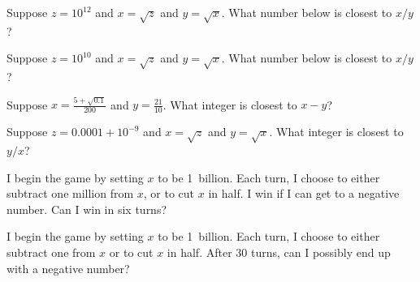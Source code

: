 \documentclass{ximera}
\begin{document}
\begin{problem}
  Suppose $z = 10^{12}$ and $x = \sqrt{z}$ and $y = \sqrt{x}$.  What number below is closest to $x/y$?
  \begin{multipleChoice}
  \end{multipleChoice}
\end{problem}

\begin{problem}
  Suppose $z = 10^{10}$ and $x = \sqrt{z}$ and $y = \sqrt{x}$.  What number below is closest to $x/y$?
  \begin{multipleChoice}
  \end{multipleChoice}
\end{problem}

\begin{problem}
  Suppose $x = \frac{5 + \sqrt{0.1}}{200}$ and $y = \frac{21}{10}$.  What integer is closest to $x - y$?
  \begin{multipleChoice}
  \end{multipleChoice}
\end{problem}

\begin{problem}
  Suppose $z = 0.0001 + 10^{-9}$ and $x = \sqrt{z}$ and $y = \sqrt{x}$.  What integer is closest to $y/x$?
  \begin{multipleChoice}
  \end{multipleChoice}
\end{problem}

\begin{problem}
  I begin the game by setting $x$ to be 1~billion.  Each turn, I
  choose to either subtract one million from $x$, or to cut $x$ in
  half.  I win if I can get to a negative number.  Can I win in six
  turns?
  \begin{multipleChoice}
  \end{multipleChoice}
\end{problem}

\begin{problem}
  I begin the game by setting $x$ to be 1~billion.  Each turn, I
  choose to either subtract one from $x$ or to cut $x$ in half.  After
  30 turns, can I possibly end up with a negative number?
  \begin{multipleChoice}
  \end{multipleChoice}
\end{problem}
\end{document}
